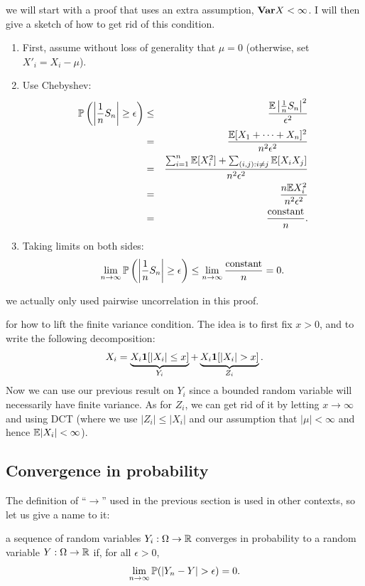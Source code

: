 \documentclass{article}
\begin{document}
 we will start with a proof that uses an extra assumption, $\var X < \infty$. I will then give a sketch of how to get rid of this condition.
\begin{enumerate}
  \item First, assume without loss of generality that $\mu = 0$ (otherwise, set $X'_i = X_i - \mu$). 
  \item Use Chebyshev:
  \begin{eqnarray*}
    \P\left(\left|\frac{1}{n}S_n\right| \ge \epsilon \right) &\le& \frac{\E\left| \frac{1}{n} S_n \right|^2}{\epsilon^2} \\
    &=& \frac{\E[X_1 + \dots + X_n]^2}{n^2 \epsilon^2} \\
    &=& \frac{\sum_{i=1}^n \E[X_i^2] + \sum_{(i,j):i\neq j} \E[X_i X_j]}{n^2 \epsilon^2} \\
    &=& \frac{n \E X_i^2}{n^2 \epsilon^2} \\
    &=& \frac{\text{constant}}{n}.
  \end{eqnarray*}
  \item Taking limits on both sides: \[ \lim_{n\to\infty} \P\left(\left|\frac{1}{n}S_n\right| \ge \epsilon \right) \le \lim_{n\to\infty} \frac{\text{constant}}{n} = 0. \]
\end{enumerate}

 we actually only used pairwise uncorrelation in this proof.

 for how to lift the finite variance condition. The idea is to first fix $x > 0$, and to write the following decomposition:
\[ X_i = \underbrace{X_i \1[|X_i| \le x]}_{Y_i} + \underbrace{X_i \1[|X_i| > x]}_{Z_i}. \]
Now we can use our previous result on $Y_i$ since a bounded random variable will necessarily have finite variance. As for $Z_i$, we can get rid of it by letting $x \to \infty$ and using DCT (where we use $|Z_i| \le |X_i|$ and our assumption that $|\mu| < \infty$ and hence $\E|X_i| < \infty$).


\subsection{Convergence in probability}

The definition of ``$\to$'' used in the previous section is used in other contexts, so let us give a name to it:

 a sequence of random variables $Y_i : \Omega \to \R$ converges in probability to a random variable $Y: \Omega \to \R$ if, for all $\epsilon > 0$,
\[ \lim_{n\to\infty} \P(|Y_n - Y| > \epsilon) = 0. \]
\end{document}

